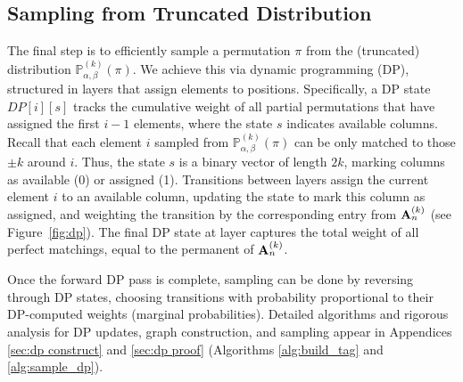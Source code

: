 \documentclass{article}
\newcommand{\bA}{\bold{A}}
\renewcommand{\P}{\mathbb{P}}
\begin{document}
\subsection{Sampling from Truncated Distribution}\label{sec:samplingDP}
The final step is to efficiently sample a permutation \(\pi\) from the (truncated) distribution \({\P}_{\alpha,\beta}^{(k)}(\pi)\). 
We achieve this via dynamic programming (DP), structured in layers  that assign elements to positions.
Specifically, a DP state \(DP[i][s]\) tracks the cumulative weight of all partial permutations that have assigned the first \(i-1\) elements, where the state \(s\) indicates available columns. Recall that each element $i$ sampled from  ${\P}_{\alpha,\beta}^{(k)}(\pi)$ can be only matched to those \(\pm k\) around \(i\). Thus, the state \(s\) is a binary vector of length \(2k\), marking columns as available (0) or assigned (1). Transitions between layers assign the current element \(i\) to an available column, updating the state to mark this column as assigned, and weighting the transition by the corresponding entry from \({\bA}_n^{(k)}\) (see Figure~\ref{fig:dp}). 
The final DP state at layer  captures the total weight of all perfect matchings, equal to the permanent of  \({\bA}_n^{(k)}\).

Once the forward DP pass is complete, 
sampling can be done by reversing through DP states, choosing transitions with probability proportional to their DP-computed weights (marginal probabilities).
Detailed algorithms and rigorous analysis for DP updates, graph construction, and sampling appear in Appendices \ref{sec:dp construct} and \ref{sec:dp proof} (Algorithms \ref{alg:build_tag} and \ref{alg:sample_dp}).




\end{document}
